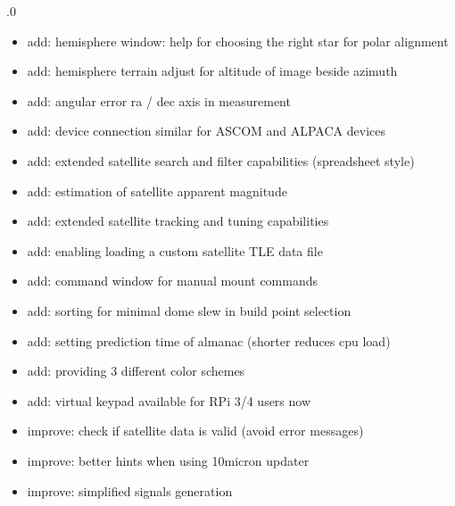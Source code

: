 \documentclass[a4paper,10pt,english]{sphinxmanual}
\begin{document}
.0
\begin{itemize}
\item {} 
\sphinxAtStartPar
add: hemisphere window: help for choosing the right star for polar alignment

\item {} 
\sphinxAtStartPar
add: hemisphere terrain adjust for altitude of image beside azimuth

\item {} 
\sphinxAtStartPar
add: angular error ra / dec axis in measurement

\item {} 
\sphinxAtStartPar
add: device connection similar for ASCOM and ALPACA devices

\item {} 
\sphinxAtStartPar
add: extended satellite search and filter capabilities (spreadsheet style)

\item {} 
\sphinxAtStartPar
add: estimation of satellite apparent magnitude

\item {} 
\sphinxAtStartPar
add: extended satellite tracking and tuning capabilities

\item {} 
\sphinxAtStartPar
add: enabling loading a custom satellite TLE data file

\item {} 
\sphinxAtStartPar
add: command window for manual mount commands

\item {} 
\sphinxAtStartPar
add: sorting for minimal dome slew in build point selection

\item {} 
\sphinxAtStartPar
add: setting prediction time of almanac (shorter reduces cpu load)

\item {} 
\sphinxAtStartPar
add: providing 3 different color schemes

\item {} 
\sphinxAtStartPar
add: virtual keypad available for RPi 3/4 users now

\item {} 
\sphinxAtStartPar
improve: check if satellite data is valid (avoid error messages)

\item {} 
\sphinxAtStartPar
improve: better hints when using 10micron updater

\item {} 
\sphinxAtStartPar
improve: simplified signals generation


\end{itemize}
\end{document}
